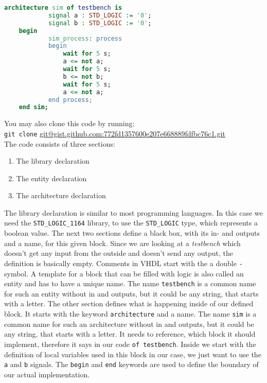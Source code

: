 \documentclass{dcbl/challenge}
\begin{document}
\begin{aufgabe}
\begin{lstlisting}[language=VHDL]
    architecture sim of testbench is
            signal a : STD_LOGIC := '0';
            signal b : STD_LOGIC := '0';
    begin
            sim_process: process                                                                                                                          
            begin
                wait for 5 s;
                a <= not a;
                wait for 5 s;
                b <= not b;
                wait for 5 s;
                a <= not a;
            end process;
    end sim;
    \end{lstlisting}
    You may also clone this code by running:\\ 
    \hspace{5cm} \texttt{git clone} \url{git@gist.github.com:772fd1357600e207e668889fdfbc76c1.git}
    \\The code consists of three sections:
    \begin{enumerate}
        \item The library declaration
        \item The entity declaration
        \item The architecture declaration
    \end{enumerate}
    The library declaration is similar to most programming languages.
    In this case we need the \texttt{STD\_LOGIC\_1164} library, to use the \texttt{STD\_LOGIC} type, which represents a boolean value.
    The next two sections define a black box, with its in- and outputs and a name, for this given block.
    Since we are looking at a \textit{testbench} which doesn't get any input from the outside and doesn't send any output, the definition is basically empty. 
    Comments in VHDL start with the a double \texttt{-} symbol.
    A template for a block that can be filled with logic is also called an entity and has to have a unique name. 
    The name \texttt{testbench} is a common name for such an entity without in and outputs, but it could be any string, that starts with a letter.
    The other section defines what is happening inside of our defined block.
    It starts with the keyword \texttt{architecture} and a name. 
    The name \texttt{sim} is a common name for such an architecture without in and outputs, but it could be any string, that starts with a letter.
    It needs to reference, which block it should implement, therefore it says in our code \texttt{of testbench}. 
    Inside we start with the definition of local variables used in this block in our case, we just want to use the \texttt{a} and \texttt{b} signals.
    The \texttt{begin} and \texttt{end} keywords are used to define the boundary of our actual implementation.

\end{aufgabe}
\end{document}

